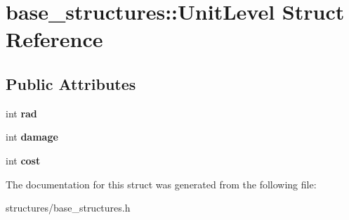 \hypertarget{structbase__structures_1_1UnitLevel}{}\section{base\+\_\+structures\+:\+:Unit\+Level Struct Reference}
\label{structbase__structures_1_1UnitLevel}
\subsection*{Public Attributes}
\begin{DoxyCompactItemize}
\item 
\mbox{\label{structbase__structures_1_1UnitLevel_a8ade778ffe68f5175f30904677e3d338}} 
int {\bfseries rad}
\item 
\mbox{\label{structbase__structures_1_1UnitLevel_a069b4dfca3b9e90609046d488a380bd6}} 
int {\bfseries damage}
\item 
\mbox{\label{structbase__structures_1_1UnitLevel_a24e4b2fd9d965f5e3bcf7274314246be}} 
int {\bfseries cost}
\end{DoxyCompactItemize}


The documentation for this struct was generated from the following file\+:\begin{DoxyCompactItemize}
\item 
structures/base\+\_\+structures.\+h\end{DoxyCompactItemize}

